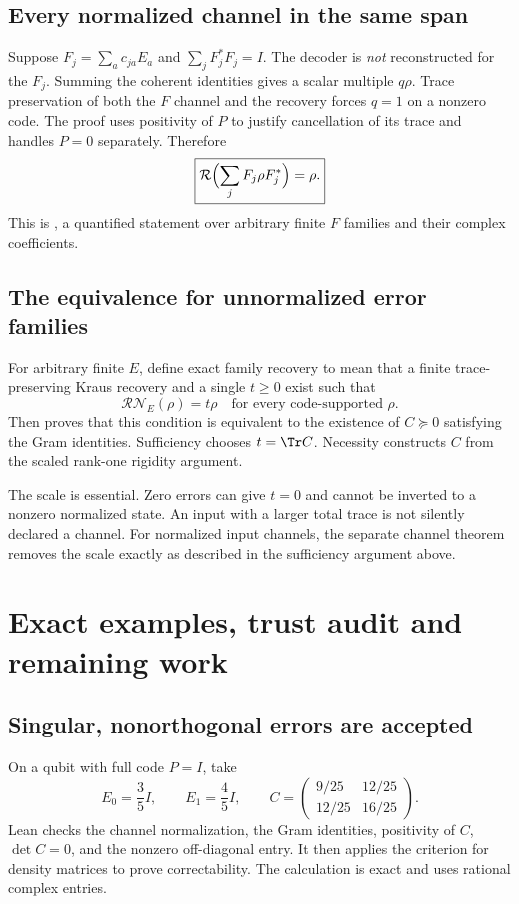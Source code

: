 \subsection{Every normalized channel in the same span}
Suppose $F_j=\sum_a c_{ja}E_a$ and $\sum_jF_j^*F_j=I$. The decoder is \emph{not} reconstructed for the $F_j$. Summing the coherent identities gives a scalar multiple $q\rho$. Trace preservation of both the $F$ channel and the recovery forces $q=1$ on a nonzero code. The proof uses positivity of $P$ to justify cancellation of its trace and handles $P=0$ separately. Therefore
\[
\boxed{\mathcal R\Bigl(\sum_jF_j\rho F_j^*\Bigr)=\rho.}
\]
This is , a quantified statement over arbitrary finite $F$ families and their complex coefficients.

\subsection{The equivalence for unnormalized error families}
For arbitrary finite $E$, define exact family recovery to mean that a finite trace-preserving Kraus recovery and a single $t\ge0$ exist such that
\[
\mathcal R\mathcal N_E(\rho)=t\rho
\quad\text{for every code-supported }\rho.
\]
Then  proves that this condition is equivalent to the existence of $C\succeq0$ satisfying the Gram identities. Sufficiency chooses $t=\Tr C$. Necessity constructs $C$ from the scaled rank-one rigidity argument.

The scale is essential. Zero errors can give $t=0$ and cannot be inverted to a nonzero normalized state. An input with a larger total trace is not silently declared a channel. For normalized input channels, the separate channel theorem removes the scale exactly as described in the sufficiency argument above.



\section{Exact examples, trust audit and remaining work}\label{supp5:section:006}
\subsection{Singular, nonorthogonal errors are accepted}
On a qubit with full code $P=I$, take
\[
E_0=\frac35I,\qquad E_1=\frac45I,\qquad
C=\begin{pmatrix}9/25&12/25\\12/25&16/25\end{pmatrix}.
\]
Lean checks the channel normalization, the Gram identities, positivity of $C$, $\det C=0$, and the nonzero off-diagonal entry. It then applies the criterion for density matrices to prove correctability. The calculation is exact and uses rational complex entries.

